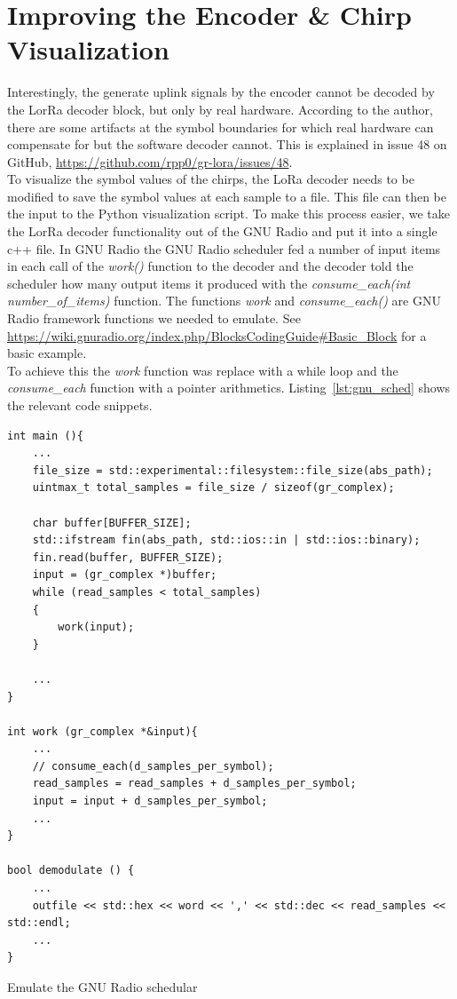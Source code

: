 \section{Improving the Encoder \& Chirp Visualization}
Interestingly, the generate uplink signals by the encoder cannot be decoded 
by the LorRa decoder block, but only by real hardware. According to the author, there are some artifacts
at the symbol boundaries for which real hardware can compensate for but the software decoder cannot.
This is explained in issue 48 on GitHub, \url{https://github.com/rpp0/gr-lora/issues/48}.
\\
To visualize the symbol values of the chirps, the LoRa decoder needs to be modified to save the symbol values at each sample to a file. This file can then be the input to 
the Python visualization script.
To make this process easier, we take the LorRa decoder functionality out of the GNU Radio and put it into a single c++ file.
In GNU Radio the GNU Radio scheduler fed a number of input items in each call of the \emph{work()} function to the decoder and the decoder told the scheduler how many output items it produced with the \emph{consume\_each(int number\_of\_items)} function.
The functions \emph{work} and \emph{consume\_each()} are GNU Radio framework functions we needed to emulate. See \url{https://wiki.gnuradio.org/index.php/BlocksCodingGuide#Basic_Block} for a basic example. \\
To achieve this the \emph{work} function was replace with a while loop and the \emph{consume\_each} function with a pointer arithmetics.
Listing~\ref{lst:gnu_sched} shows the relevant code snippets.

\begin{listing}[h]
    \begin{verbatim}
int main (){
    ...
    file_size = std::experimental::filesystem::file_size(abs_path);
    uintmax_t total_samples = file_size / sizeof(gr_complex);

    char buffer[BUFFER_SIZE];
    std::ifstream fin(abs_path, std::ios::in | std::ios::binary);
    fin.read(buffer, BUFFER_SIZE);
    input = (gr_complex *)buffer;
    while (read_samples < total_samples)
    {
        work(input);
    }

    ...
}

int work (gr_complex *&input){
    ...
    // consume_each(d_samples_per_symbol);
    read_samples = read_samples + d_samples_per_symbol;
    input = input + d_samples_per_symbol;
    ...
}

bool demodulate () {
    ... 
    outfile << std::hex << word << ',' << std::dec << read_samples << std::endl;
    ...
}
        \end{verbatim}
        \caption{Emulate the GNU Radio schedular}
        \label{lst:gnu_sched}
\end{listing}

